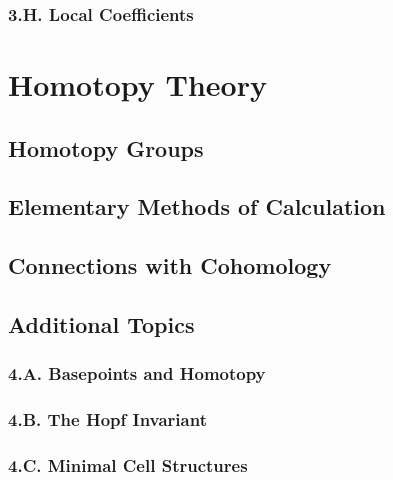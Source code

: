 \documentclass{article}
\begin{document}
\subsubsection*{3.H. Local Coefficients}

\newpage

\section{Homotopy Theory}

\subsection{Homotopy Groups}

\subsection{Elementary Methods of Calculation}

\subsection{Connections with Cohomology}

\subsection*{Additional Topics}

\subsubsection*{4.A. Basepoints and Homotopy}

\subsubsection*{4.B. The Hopf Invariant}

\subsubsection*{4.C. Minimal Cell Structures}
\end{document}
